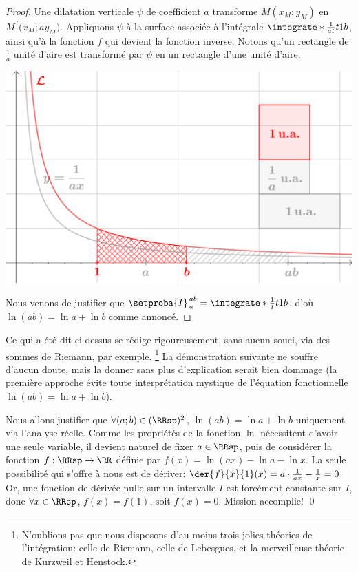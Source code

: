 \begin{proof}
	Une dilatation verticale $\psi$ de coefficient $a$ transforme $M(x_M ; y_M)$ en $M^{\,\prime}\big( x_M ; a y_M)$. 
	Appliquons $\psi$ à la surface associée à l'intégrale $\integrate*{\frac{1}{at}}{t}{1}{b}$, ainsi qu'à la fonction $f$ qui devient la fonction inverse. Notons qu'un rectangle de $\frac1a$ unité d'aire est transformé par $\psi$ en un rectangle d'une unité d'aire.

	\begin{center}
		\includegraphics[scale=.5]{content/ln/func-eq-3.png}
	\end{center}
	
	Nous venons de justifier que $\setproba{I}_{\,a}^{\,ab} = \integrate*{\frac{1}{t}}{t}{1}{b}$,
	d'où $\ln(a b) = \ln a + \ln b$ comme annoncé.
\end{proof}


\begin{remark}
	Ce qui a été dit ci-dessus se rédige rigoureusement, sans aucun souci, via des sommes de Riemann, par exemple.%
	\footnote{
		N'oublions pas que nous disposons d'au moins trois jolies théories de l'intégration:
    	celle de Riemann,
    	celle de Lebesgues,
    	et
    	la merveilleuse théorie de Kurzweil et Henstock.
	}
	La démonstration suivante ne souffre d'aucun doute, mais la donner sans plus d'explication serait bien dommage (la première approche évite toute interprétation mystique de l'équation fonctionnelle $\ln(a b) = \ln a + \ln b$). 
\end{remark}


{
\emph{\altproof{}}
	Nous allons justifier que 
	$\forall (a;b) \in ( \RRsp )^2$,
	$\ln(a b) = \ln a + \ln b$
	uniquement via l'analyse réelle.
	Comme les propriétés de la fonction $\ln$ nécessitent d'avoir une seule variable,
	il devient naturel de fixer $a \in \RRsp$, puis de considérer la fonction
	$f: \RRsp \to \RR$
	définie par
	$f(x) = \ln(a x) - \ln a - \ln x$.
	La seule possibilité qui s'offre à nous est de dériver:
	$\der{f}{x}{1}(x) = a \cdot \frac{1}{a x} - \frac1x = 0$.
	Or,
	une fonction de dérivée nulle sur un intervalle $I$ est forcément constante sur $I$,
	donc
	$\forall x \in \RRsp$,
	$f(x) = f(1)$,
	soit
	$f(x) = 0$.
	Mission accomplie!
\qed
}


